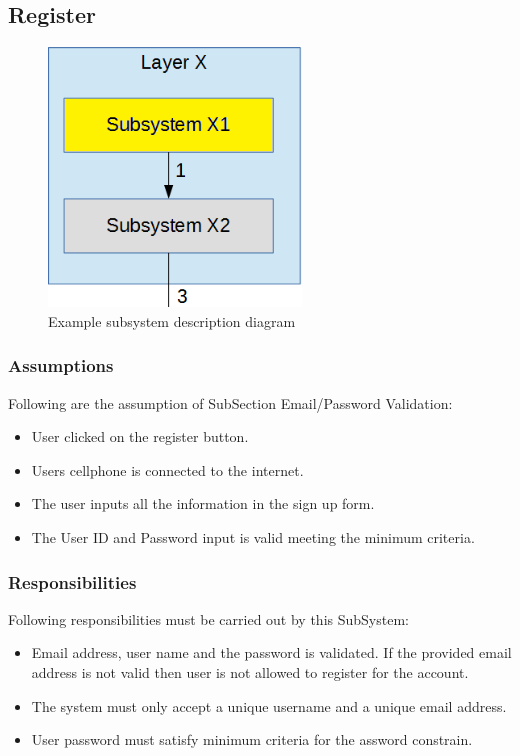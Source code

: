 \subsection{Register}


\begin{figure}[h!]
	\centering
 	\includegraphics[width=0.60\textwidth]{images/subsystem}
 \caption{Example subsystem description diagram}
\end{figure}

\subsubsection{Assumptions}
Following are the assumption of SubSection Email/Password Validation:
\begin{itemize}
    \item User clicked on the register button.
    \item Users cellphone is connected to the internet.
    \item The user inputs all the information in the sign up form.
    \item The User ID and Password input is valid meeting the minimum criteria.
\end{itemize}
\subsubsection{Responsibilities}
Following responsibilities must be carried out by this SubSystem:
\begin{itemize}
    \item Email address, user name and the password is validated. If the provided email address is not valid then user is not allowed to register for the account.
    \item The system must only accept a unique username and a unique email address.
    \item User password must satisfy minimum criteria for the assword constrain.
\end{itemize}

